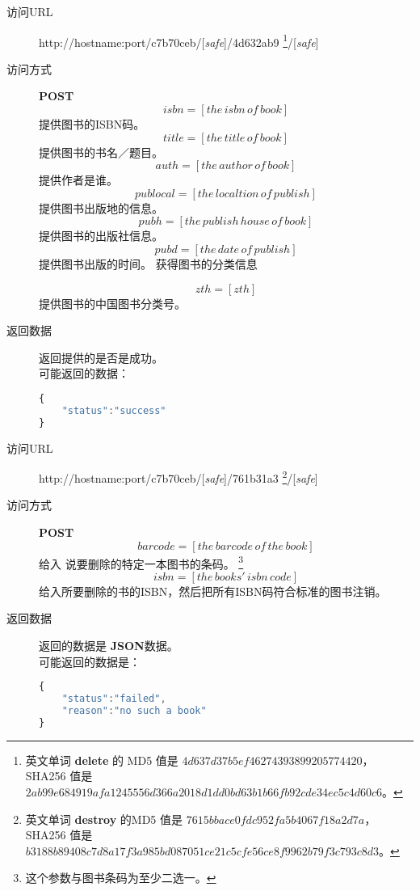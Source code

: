 \documentclass[UTF8]{article}
\def\safe{/[\textit{safe}]}
\def\POST{\colorbox[rgb]{0.77,0.53,0.97}{\textbf{POST}}}
\def\bfJSON{\textbf{JSON}}
\def\viaurl{\item[{\quad\colorbox[rgb]{0.47,0.88,0.89}{访问URL}}]}
\def\viareq#1{\item[{\quad\colorbox[rgb]{0.57,0.88,0.99}{访问方式}}] #1}
\def\rtdata{\item[{\quad\colorbox[rgb]{0.70,0.9,0.59}{返回数据}}]}
\begin{document}
        \begin{description}
        \viaurl http://hostname:port/c7b70ceb\safe/4d632ab9
        \footnote{
            英文单词 \textbf{delete} 的
            MD5 值是 $4d637d37b5ef46274393899205774420$，
            SHA256 值是 $2ab99e684919afa1245556d366a2018d1dd0bd63b1b66fb92cde34ec5c4d60c6$。
        }\safe
        \viareq{\POST}
        $$isbn=[the\,isbn\,of\,book]$$
        提供图书的ISBN码。
        $$title=[the\,title\,of\,book]$$
        提供图书的书名／题目。
        $$auth=[the\,author\,of\,book]$$
        提供作者是谁。
        $$publocal=[the\,localtion\,of\,publish]$$
        提供图书出版地的信息。
        $$pubh=[the\,publish\,house\,of\,book]$$
        提供图书的出版社信息。
        $$pubd=[the\,date\,of\,publish]$$
        提供图书出版的时间。
         获得图书的分类信息

        $$zth=[zth]$$
        提供图书的中国图书分类号。
        \rtdata 返回提供的是否是成功。
	    	\\ 可能返回的数据：
        \begin{lstlisting}[language=JavaScript]
{
    "status":"success"
}
		\end{lstlisting}
        \end{description}
        \begin{description}
		\viaurl http://hostname:port/c7b70ceb\safe/761b31a3
        \footnote{
            英文单词 \textbf{destroy} 的MD5 值是
            $7615bbace0fdc952fa5b4067f18a2d7a$，
            SHA256 值是
            $b3188b89408c7d8a17f3a985bd087051ce21c5cfe56ce8f9962b79f3c793c8d3$。
        }\safe
        \viareq{\POST}
        				$$barcode=[the\,barcode\,of\,the\,book]$$
          给入 说要删除的特定一本图书的条码。
        \footnote{这个参数与图书条码为至少二选一。}
          $$isbn=[the\,books'\,isbn\,code]$$
          给入所要删除的书的ISBN，然后把所有ISBN码符合标准的图书注销。
        \rtdata 返回的数据是 \bfJSON 数据。
        \\ 可能返回的数据是：
        \begin{lstlisting}[language=JavaScript]
{
    "status":"failed",
    "reason":"no such a book"
}
        \end{lstlisting}
        \end{description}
\end{document}
